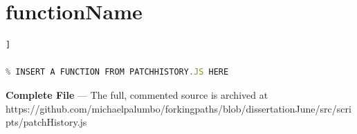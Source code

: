 \section{functionName}

\begin{lstlisting}[language=JavaScript, caption={The createMerge function takes two changeNodes selected by the player and merges them. A new branch is created to store the result of the merge. The unified patch state is then loaded into the main application and rendered in the visual and audio synth graphs.}, label={lst:functionName-function}]]

% INSERT A FUNCTION FROM PATCHHISTORY.JS HERE 
\end{lstlisting}

\bigskip
\textbf{Complete File} — The full, commented source is archived at
\\https://github.com/michaelpalumbo/forkingpaths/blob/dissertationJune/src/scripts/patchHistory.js
